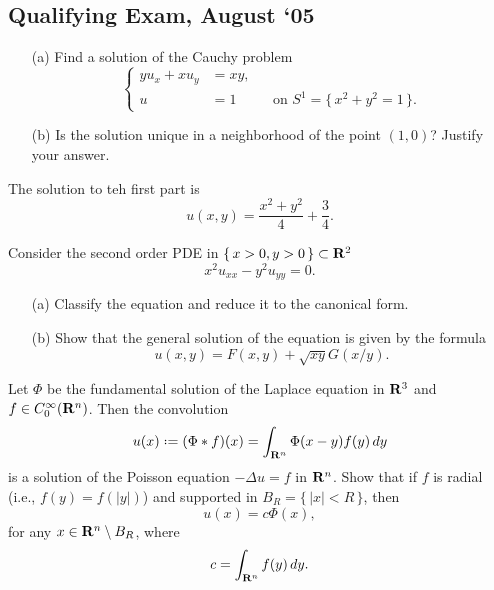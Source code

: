 \subsection{Qualifying Exam, August `05}
\begin{problem}
  \hfill
  \begin{itemize}[noitemsep]
  \item[(a)] Find a solution of the Cauchy problem
    \[
      \left\{
        \begin{aligned}
          yu_x+xu_y&=xy,\\
          u&=1&&\text{on \(S^1=\bigl\{\,x^2+y^2=1\,\bigr\}\)}.
        \end{aligned}
      \right.
    \]
  \item[(b)] Is the solution unique in a neighborhood of the point
    \((1,0)\)? Justify your answer.
  \end{itemize}
\end{problem}
\begin{solution*}
  The solution to teh first part is
  \[
    u(x,y)=\frac{x^2+y^2}{4}+\frac{3}{4}.
  \]
\end{solution*}

\begin{problem}
  Consider the second order PDE in \(\{\,x>0,y>0\,\}\subset\mathbf{R}^2\)
  \[
    x^2u_{xx}-y^2u_{yy}=0.
  \]
  \begin{itemize}[noitemsep]
  \item[(a)] Classify the equation and reduce it to the canonical form.
  \item[(b)] Show that the general solution of the equation is given by the
    formula
    \[
      u(x,y)=F(x,y)+\sqrt{xy}G(x/y).
    \]
  \end{itemize}
\end{problem}
\begin{solution*}
\end{solution*}

\begin{problem}
  Let \(\Phi\) be the fundamental solution of the Laplace equation in
  \(\mathbf{R}^3\) and \(f\in C_0^\infty(\mathbf{R}^n)\). Then the convolution
  \[
    u(x)\defeq(\Phi*f)(x)=\int_{\bfR^n}\Phi(x-y)f(y)\diff y
  \]
  is a solution of the Poisson equation \(-\Delta u=f\) in \(\mathbf{R}^n\). Show
  that if \(f\) is radial (i.e., \(f(y)=f(|y|)\)) and supported in
  \(B_R=\{\,|x|<R\,\}\), then
  \[
    u(x)=c\Phi(x),
  \]
  for any \(x\in\mathbf{R}^n\setminus B_R\), where
  \[
    c=\int_{\mathbf{R}^n}f(y)\mathop{}\!d y.
  \]

\end{problem}
\begin{solution*}
\end{solution*}

